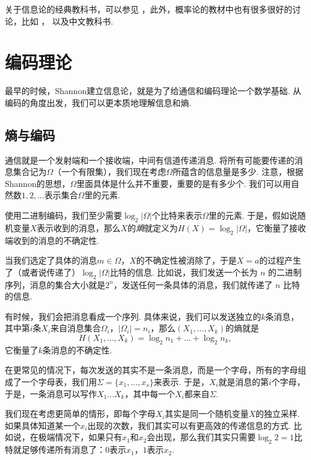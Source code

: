 \begin{remark}
    关于信息论的经典教科书，可以参见 \cite{coverElementsInformationTheory2012} ，此外，概率论的教材中也有很多很好的讨论，比如 \cite{durrettProbabilityTheoryExamples2019}，\cite{shiryaevProbability1996} 以及中文教科书\cite{LiXianPingGaiLuLunJiChu2010}.
\end{remark}

\section{编码理论}\label{sec:entropy-and-communication}
最早的时候，Shannon建立信息论，就是为了给通信和编码理论一个数学基础. 从编码的角度出发，我们可以更本质地理解信息和熵. 

\subsection{熵与编码}

通信就是一个发射端和一个接收端，中间有信道传递消息. 将所有可能要传递的消息集合记为$\Omega$（一个有限集），我们现在考虑$\Omega$所蕴含的信息量是多少. 注意，根据Shannon的思想，$\Omega$里面具体是什么并不重要，重要的是有多少个. 我们可以用自然数$1,2,\dots$表示集合$\Omega$里的元素. 

使用二进制编码，我们至少需要$\log_2 |\Omega|$个比特来表示$\Omega$里的元素. 于是，假如说随机变量$X$表示收到的消息，那么$X$的\textit{熵}就定义为$H(X)=\log_2 |\Omega|$，它衡量了接收端收到的消息的不确定性. 

当我们选定了具体的消息$m\in \Omega$，$X$的不确定性被消除了，于是$X=a$的过程产生了（或者说传递了）$\log_2 |\Omega|$比特的信息. 比如说，我们发送一个长为 $n$ 的二进制序列，消息的集合大小就是$2^n$，发送任何一条具体的消息，我们就传递了 $n$ 比特的信息.

有时候，我们会把消息看成一个序列. 具体来说，我们可以发送独立的$k$条消息，其中第$i$条$X_i$来自消息集合$\Omega_i$，$|\Omega_i|=n_i$，那么$(X_1,\dots,X_k)$的熵就是
\[H(X_1,\dots,X_k)=\log_2 n_1+\dots+\log_2 n_k,\]
它衡量了$k$条消息的不确定性. 

在更常见的情况下，每次发送的其实不是一条消息，而是一个字母，所有的字母组成了一个字母表，我们用$\Sigma=\{x_1,\dots,x_s\}$来表示. 于是，$X_i$就是消息的第$i$个字母，于是，一条消息可以写作$X_1\dots X_k$，其中每一个$X_i$都来自$\Sigma$.

我们现在考虑更简单的情形，即每个字母$X_i$其实是同一个随机变量$X$的独立采样. 如果具体知道某一个$x_i$出现的次数，我们其实可以有更高效的传递信息的方式. 比如说，在极端情况下，如果只有$x_1$和$x_2$会出现，那么我们其实只需要$\log_2 2=1$比特就足够传递所有消息了：$0$表示$x_1$，$1$表示$x_2$.

